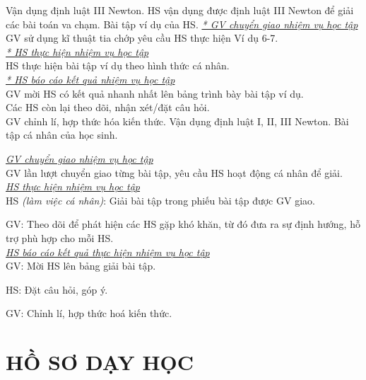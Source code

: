 \hoatdong
{Vận dụng định luật III Newton.
}
{HS vận dụng được định luật III Newton để giải các bài toán va chạm.
}
{Bài tập ví dụ của HS.
}
{\textit{\underline{* GV chuyển giao nhiệm vụ học tập}}\\
	GV sử dụng kĩ thuật tia chớp yêu cầu HS thực hiện Ví dụ 6-7.\\
	\textit{\underline{* HS thực hiện nhiệm vụ học tập}}\\
	HS thực hiện bài tập ví dụ theo hình thức cá nhân.\\
	\textit{\underline{* HS báo cáo kết quả nhiệm vụ học tập}}\\
	GV mời HS có kết quả nhanh nhất lên bảng trình bày bài tập ví dụ.\\
	Các HS còn lại theo dõi, nhận xét/đặt câu hỏi.\\
	GV chỉnh lí, hợp thức hóa kiến thức.
}
{
	Vận dụng định luật I, II, III Newton.
}
{
	Bài tập cá nhân của học sinh.
}
{
	\textit{\underline{GV chuyển giao nhiệm vụ học tập}}\\
	GV lần lượt chuyển giao từng bài tập, yêu cầu HS hoạt động cá nhân để giải.\\
	\textit{\underline{HS thực hiện nhiệm vụ học tập}}\\
	HS \textit{(làm việc cá nhân)}:  Giải bài tập trong phiếu bài tập được GV giao. 
	
	GV: Theo dõi để phát hiện các HS gặp khó khăn, từ đó đưa ra sự định hướng, hỗ trợ phù hợp cho mỗi HS.\\
	\textit{\underline{HS báo cáo kết quả thực hiện nhiệm vụ học tập}}\\
	GV: Mời HS lên bảng giải bài tập.
	
	HS: Đặt câu hỏi, góp ý.
	
	GV: Chỉnh lí, hợp thức hoá kiến thức.
}
\section{HỒ SƠ DẠY HỌC}
